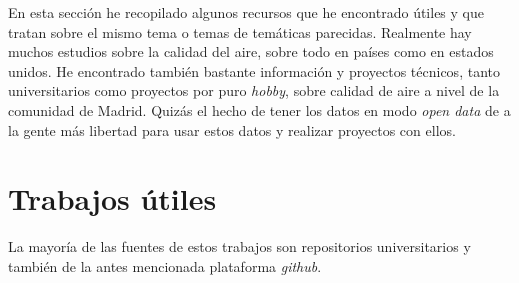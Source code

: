 
En esta sección he recopilado algunos recursos que he encontrado útiles y que tratan sobre el mismo tema o temas de temáticas parecidas. Realmente hay muchos estudios sobre la calidad del aire, sobre todo en países como en estados unidos. He encontrado también bastante información y proyectos técnicos, tanto universitarios como proyectos por puro \textit{hobby}, sobre calidad de aire a nivel de la comunidad de Madrid. Quizás el hecho de tener los datos en modo \textit{open data} de a la gente más libertad para usar estos datos y realizar proyectos con ellos.

\section{Trabajos útiles}

La mayoría de las fuentes de estos trabajos son repositorios universitarios y también de la antes mencionada plataforma  \textit{github}. 

